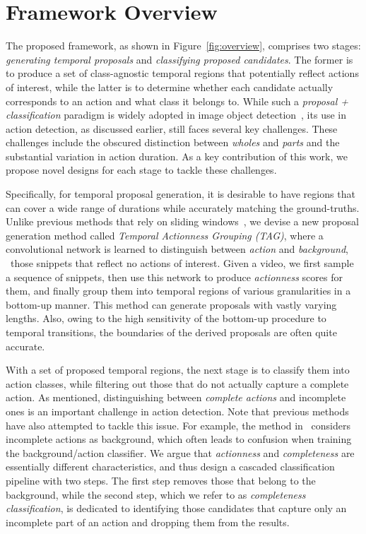 \documentclass[10pt,twocolumn,letterpaper]{article}
\begin{document}
\section{Framework Overview}
\label{sec:overview}

The proposed framework, as shown in Figure~\ref{fig:overview},  
comprises two stages: 
\emph{generating temporal proposals} and
\emph{classifying proposed candidates}. 
The former is to produce a set of class-agnostic temporal regions 
that potentially reflect actions of interest,
while the latter is to determine whether each candidate actually
corresponds to an action and what class it belongs to.
While such a \emph{proposal + classification} paradigm is widely 
adopted in image object detection~\cite{Gu2009RegionIdea,Girshick2014RCNN},
its use in action detection, as discussed earlier, still faces several key challenges.
These challenges include the obscured distinction between \emph{wholes} and \emph{parts} and
the substantial variation in action duration.
As a key contribution of this work, we propose novel designs for each stage 
to tackle these challenges.

Specifically, for temporal proposal generation,
it is desirable to have regions that can cover a wide range of durations
while accurately matching the ground-truths. 
Unlike previous methods that rely on sliding windows~\cite{karaman2014fast,Yuan2016ScorePyramids}, 
we devise a new proposal generation method called \emph{Temporal Actionness Grouping (TAG)},
where a convolutional network is learned to distinguish between \emph{action} 
and \emph{background}, \ie~those snippets that reflect no actions of interest. 
Given a video, we first sample a sequence of snippets, 
then use this network to produce \emph{actionness} scores for them, 
and finally group them into temporal regions of various granularities in a bottom-up manner. 
This method can generate proposals with vastly varying lengths.
Also, owing to the high sensitivity of the bottom-up procedure to temporal transitions, 
the boundaries of the derived proposals are often quite accurate.

With a set of proposed temporal regions, the next stage is to 
classify them into action classes, while filtering out those that 
do not actually capture a complete action. 
As mentioned, distinguishing between 
\emph{complete actions} and incomplete ones is an important challenge
in action detection. 
Note that previous methods have also attempted to tackle this issue.
For example, the method in~\cite{Shou2016SCNN} considers incomplete actions
as background, which often leads to confusion when training the background/action 
classifier. 
We argue that \emph{actionness} and \emph{completeness} are essentially different
characteristics,  and thus design a cascaded classification pipeline with two 
steps.
The first step removes those that belong to the background, 
while the second step, which we refer to as \emph{completeness classification},
is dedicated to identifying those candidates that capture only an incomplete 
part of an action and dropping them from the results.
\end{document}
